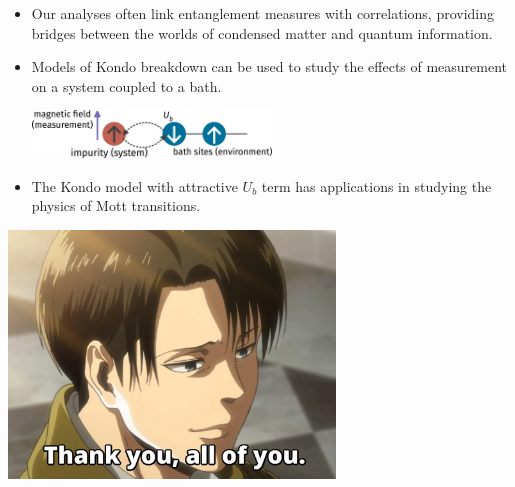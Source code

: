 \documentclass[10pt,aspectratio=169]{beamer}
\begin{document}
\begin{frame}{}
	\begin{itemize}
	\item Our analyses often link entanglement measures with correlations, providing bridges between the worlds of condensed matter and quantum information.\\[10pt]
	\item Models of Kondo breakdown can be used to study the effects of measurement on a system coupled to a bath.\\[10pt]
	\begin{center}
	\includegraphics[width=0.5\textwidth]{measurement.pdf}
	\end{center}
	\item The Kondo model with attractive \(U_b\) term has applications in studying the physics of Mott transitions.
\end{itemize}
\end{frame}

\begin{frame}
	\includegraphics[width=0.65\textwidth]{thanks.pdf}
\end{frame}
\end{document}
